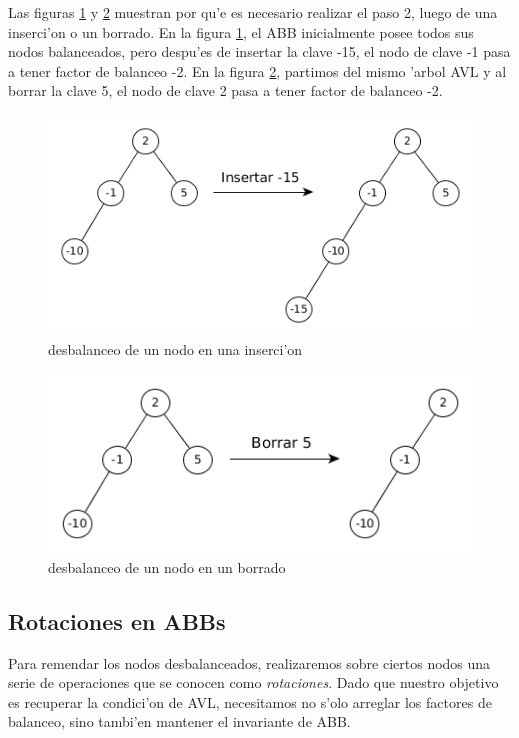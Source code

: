 Las figuras \ref{fig5} y \ref{fig6} muestran por qu'e es necesario realizar el paso 2, luego de una inserci'on o un borrado. En la figura \ref{fig5}, el ABB inicialmente posee todos sus nodos balanceados, pero despu'es de insertar la clave -15, el nodo de clave -1 pasa a tener factor de balanceo -2. En la figura \ref{fig6}, partimos del mismo 'arbol AVL y al borrar la clave 5, el nodo de clave 2 pasa a tener factor de balanceo -2.

\begin{figure}[h]
	\begin{center}
		\includegraphics[scale=0.6]{imagenes/fig5.jpg}
	\end{center}
	\caption{desbalanceo de un nodo en una inserci'on}
	\label{fig5}
\end{figure}

\begin{figure}[h]
	\begin{center}
		\includegraphics[scale=0.6]{imagenes/fig6.jpg}
	\end{center}
	\caption{desbalanceo de un nodo en un borrado}
	\label{fig6}
\end{figure}


\subsection{Rotaciones en ABBs}

Para remendar los nodos desbalanceados, realizaremos sobre ciertos nodos una serie de operaciones que se conocen como \textit{rotaciones}. Dado que nuestro objetivo es recuperar la condici'on de AVL, necesitamos no s'olo arreglar los factores de balanceo, sino tambi'en mantener el invariante de ABB.

